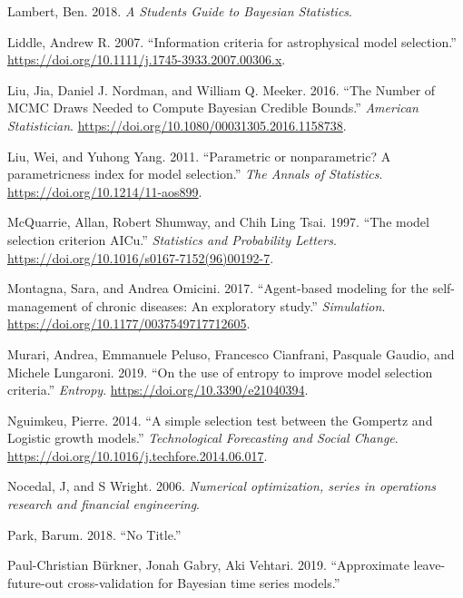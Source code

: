 \documentclass[]{article}
\begin{document}
\leavevmode\hypertarget{ref-Lambert2018}{}%
Lambert, Ben. 2018. \emph{A Students Guide to Bayesian Statistics}.

\leavevmode\hypertarget{ref-Liddle2007}{}%
Liddle, Andrew R. 2007. ``Information criteria for astrophysical model
selection.'' \url{https://doi.org/10.1111/j.1745-3933.2007.00306.x}.

\leavevmode\hypertarget{ref-Liu2016}{}%
Liu, Jia, Daniel J. Nordman, and William Q. Meeker. 2016. ``The Number
of MCMC Draws Needed to Compute Bayesian Credible Bounds.''
\emph{American Statistician}.
\url{https://doi.org/10.1080/00031305.2016.1158738}.

\leavevmode\hypertarget{ref-Liu2011}{}%
Liu, Wei, and Yuhong Yang. 2011. ``Parametric or nonparametric? A
parametricness index for model selection.'' \emph{The Annals of
Statistics}. \url{https://doi.org/10.1214/11-aos899}.

\leavevmode\hypertarget{ref-McQuarrie1997}{}%
McQuarrie, Allan, Robert Shumway, and Chih Ling Tsai. 1997. ``The model
selection criterion AICu.'' \emph{Statistics and Probability Letters}.
\url{https://doi.org/10.1016/s0167-7152(96)00192-7}.

\leavevmode\hypertarget{ref-Montagna2017}{}%
Montagna, Sara, and Andrea Omicini. 2017. ``Agent-based modeling for the
self-management of chronic diseases: An exploratory study.''
\emph{Simulation}. \url{https://doi.org/10.1177/0037549717712605}.

\leavevmode\hypertarget{ref-Murari2019}{}%
Murari, Andrea, Emmanuele Peluso, Francesco Cianfrani, Pasquale Gaudio,
and Michele Lungaroni. 2019. ``On the use of entropy to improve model
selection criteria.'' \emph{Entropy}.
\url{https://doi.org/10.3390/e21040394}.

\leavevmode\hypertarget{ref-Nguimkeu2014}{}%
Nguimkeu, Pierre. 2014. ``A simple selection test between the Gompertz
and Logistic growth models.'' \emph{Technological Forecasting and Social
Change}. \url{https://doi.org/10.1016/j.techfore.2014.06.017}.

\leavevmode\hypertarget{ref-Nocedal2006}{}%
Nocedal, J, and S Wright. 2006. \emph{Numerical optimization, series in
operations research and financial engineering}.

\leavevmode\hypertarget{ref-Park2018}{}%
Park, Barum. 2018. ``No Title.''

\leavevmode\hypertarget{ref-Burkner2019}{}%
Paul-Christian Bürkner, Jonah Gabry, Aki Vehtari. 2019. ``Approximate
leave-future-out cross-validation for Bayesian time series models.''
\end{document}
